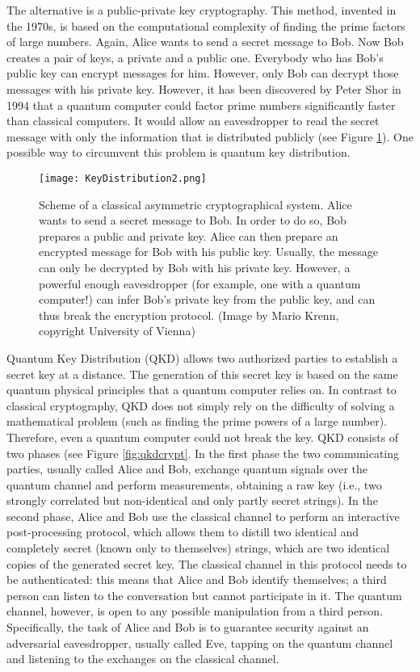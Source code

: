 \documentclass{article}
\begin{document}
The alternative is a public-private key cryptography. This method, invented in the 1970s, is based on the computational complexity of finding the prime factors of large numbers. Again, Alice wants to send a secret message to Bob. Now Bob creates a pair of keys, a private and a public one. Everybody who has Bob's public key can encrypt messages for him. However, only Bob can decrypt those messages with his private key. However, it has been discovered by Peter Shor in 1994 that a quantum computer could factor prime numbers significantly faster than classical computers. It would allow an eavesdropper to read the secret message with only the information that is distributed publicly (see Figure \ref{fig:asymmCrypt}). One possible way to circumvent this problem is quantum key distribution. 

\begin{figure}[h!]
\centering
\texttt{[image: KeyDistribution2.png]}
\caption{Scheme of a classical asymmetric cryptographical system. Alice wants to send a secret message to Bob. In order to do so, Bob prepares a public and private key. Alice can then prepare an encrypted message for Bob with his public key. Usually, the message can only be decrypted by Bob with his private key. However, a powerful enough eavesdropper (for example, one with a quantum computer!) can infer Bob's private key from the public key, and can thus break the encryption protocol.  (Image by Mario Krenn, copyright University of Vienna)}
\label{fig:asymmCrypt}
\end{figure}

Quantum Key Distribution (QKD) allows two authorized parties to establish a secret key at a distance. The generation of this secret key is based on the same quantum physical principles that a quantum computer relies on. In contrast to classical cryptography, QKD does not simply rely on the difficulty of solving a mathematical problem (such as finding the prime powers of a large number). Therefore, even a quantum computer could not break the key. QKD consists of two phases (see Figure \ref{fig:qkdcrypt}. In the first phase the two communicating parties, usually called Alice and Bob, exchange quantum signals over the quantum channel and perform measurements, obtaining a raw key (i.e., two strongly correlated but non-identical and only partly secret strings). In the second phase, Alice and Bob use the classical channel to perform an interactive post-processing protocol, which allows them to distill two identical and completely secret (known only to themselves) strings, which are two identical copies of the generated secret key.
The classical channel in this protocol needs to be authenticated: this means that Alice and Bob identify themselves; a third person can listen to the conversation but cannot participate in it. The quantum channel, however, is open to any possible manipulation from a third person. Specifically, the task of Alice and Bob is to guarantee security against an adversarial eavesdropper, usually called Eve, tapping on the quantum channel and listening to the exchanges on the classical channel.
\end{document}
